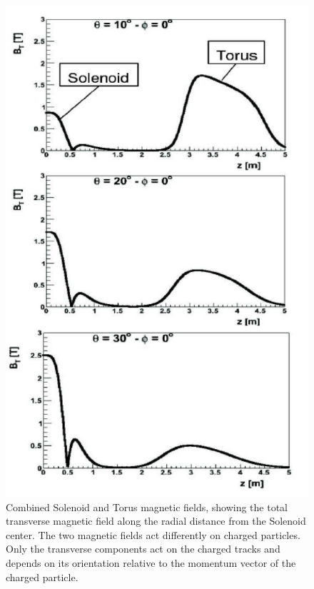 \documentclass[final,3p,twocolumn]{elsarticle}
\begin{document}
 
\begin{figure}[htbp!]
\centerline{\includegraphics[width=1.0\columnwidth]{magfield.png}}
\caption{\footnotesize Combined Solenoid and Torus magnetic fields, showing the total transverse magnetic field along 
the radial distance from the Solenoid center. The two magnetic fields act differently on charged particles.
Only the transverse components act on the charged tracks and depends on its orientation relative to the 
momentum vector of the charged particle. 
}
\label{solenoid-torus}
\end{figure}
\end{document}
